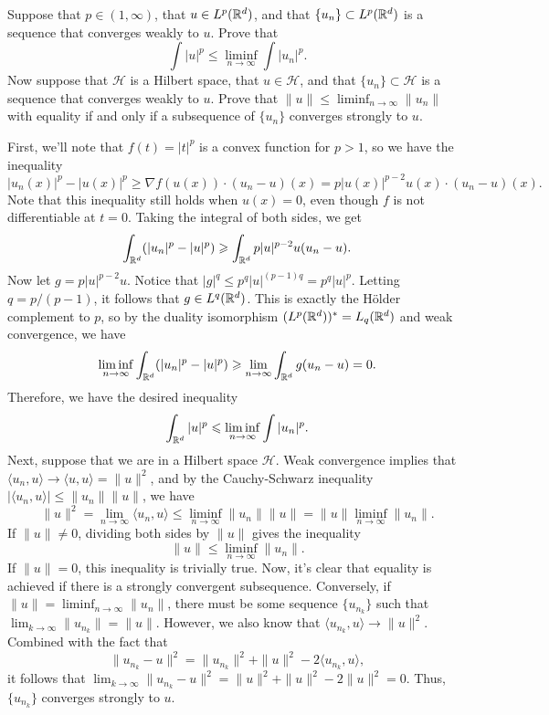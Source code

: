 \documentclass{lkx_pset}
\begin{document}
\begin{problem}{3}
  Suppose that $p\in (1,\infty)$, that $u\in L^p(\mathbb{R}^d)$, and that $\{u_n\}\subset L^p(\mathbb{R}^d)$ is a sequence that converges weakly to $u$. Prove that
  \[
    \int |u|^p \leq \liminf_{n\to\infty} \int |u_n|^p.
  \]
  Now suppose that $\mathcal{H}$ is a Hilbert space, that $u\in \mathcal{H}$, and that $\{u_n\}\subset \mathcal{H}$ is a sequence that converges weakly to $u$. Prove that $\|u\|\leq \liminf_{n\to \infty}\|u_n\|$ with equality if and only if a subsequence of $\{u_n\}$ converges strongly to $u$.
\end{problem}
\begin{solution}
  First, we'll note that $f(t)=|t|^p$ is a convex function for $p>1$, so we have the inequality
  \begin{equation}
      |u_n(x)|^p-|u(x)|^p \geq \nabla f(u(x)) \cdot (u_n-u)(x) = p|u(x)|^{p-2}u(x)\cdot (u_n-u)(x).
  \end{equation}
  Note that this inequality still holds when $u(x)=0$, even though $f$ is not differentiable at $t=0$. Taking the integral of both sides, we get
  \begin{equation}
    \int_{\mathbb{R}^d} (|u_n|^p - |u|^p) \geqslant \int_{\mathbb{R}^d} p|u|^{p-2}u(u_n - u).
  \end{equation}
  Now let $g=p|u|^{p-2}u$. Notice that $|g|^q \leq p^q|u|^{(p-1)q}=p^q|u|^p$. Letting $q=p/(p-1)$, it follows that $g\in L^q(\mathbb{R}^d)$. This is exactly the H\"older complement to $p$, so by the duality isomorphism $(L^p(\mathbb{R}^d))^* = L_q(\mathbb{R}^d)$ and weak convergence, we have
  \[
    \liminf_{n\to \infty}\int_{\mathbb{R}^d} (|u_n|^p - |u|^p) \geqslant \lim_{n\to \infty}\int_{\mathbb{R}^d} g(u_n-u) = 0.
  \]
  Therefore, we have the desired inequality
  \[
    \int_{\mathbb{R}^d} |u|^p \leqslant \liminf_{n\to\infty}\int |u_n|^p.
  \]
  Next, suppose that we are in a Hilbert space $\mathcal{H}$. Weak convergence implies that $\langle u_n, u\rangle \to \langle u, u\rangle = \|u\|^2$, and by the Cauchy-Schwarz inequality $|\langle u_n, u\rangle| \leq \|u_n\|\|u\|$, we have
  \[
    \|u\|^2 = \lim_{n\to\infty}\langle u_n, u\rangle \leq \liminf_{n\to\infty} \|u_n\|\|u\| = \|u\|\liminf_{n\to\infty}\|u_n\|.
  \]
  If $\|u\|\neq 0$, dividing both sides by $\|u\|$ gives the inequality
  \[
    \|u\|\leq \liminf_{n\to\infty}\|u_n\|.
  \]
  If $\|u\|=0$, this inequality is trivially true. Now, it's clear that equality is achieved if there is a strongly convergent subsequence. Conversely, if $\|u\|=\liminf_{n\to \infty}\|u_n\|$, there must be some sequence $\{u_{n_k}\}$ such that $\lim_{k\to\infty} \|u_{n_k}\| = \|u\|$. However, we also know that $\langle u_{n_k}, u\rangle\to \|u\|^2$. Combined with the fact that
  \[
    \|u_{n_k}-u\|^2 = \|u_{n_k}\|^2 + \|u\|^2 - 2\langle u_{n_k}, u\rangle,
  \]
  it follows that $\lim_{k\to\infty}\|u_{n_k}-u\|^2 = \|u\|^2+\|u\|^2-2\|u\|^2 = 0$.
  Thus, $\{u_{n_k}\}$ converges strongly to $u$.
\end{solution}
\end{document}
